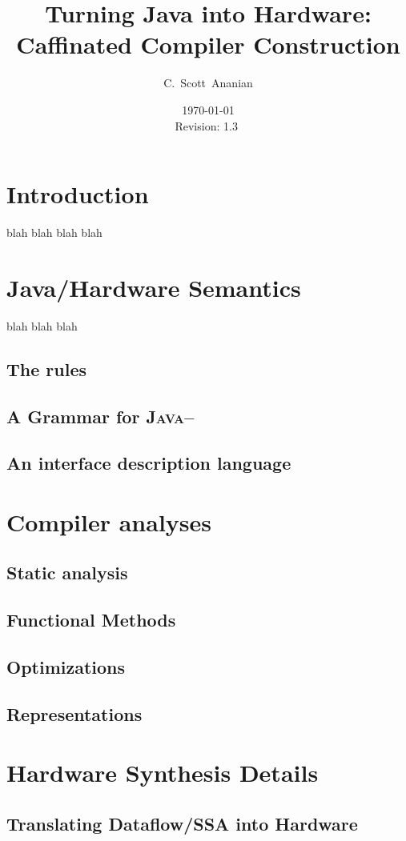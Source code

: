 \documentclass[10pt,notitlepage,twocolumn]{article}
\author{C.~Scott~Ananian}
\title{Turning Java into Hardware: \\ Caffinated Compiler Construction}
\date{\today \\ $ $Revision: 1.3 $ $}
\begin{document}

\maketitle

\section{Introduction}
blah blah blah blah

\section{Java/Hardware Semantics}
blah blah blah

\subsection{The rules}

\subsection{A Grammar for \textsc{Java--}}
\subsection{An interface description language}
\section{Compiler analyses}
\subsection{Static analysis} %
\subsection{Functional Methods}
\subsection{Optimizations}
\subsection{Representations}
\section{Hardware Synthesis Details}
\subsection{Translating Dataflow/SSA into Hardware}
\end{document}

